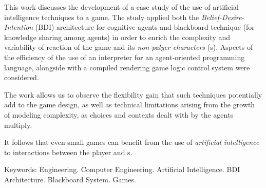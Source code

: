 This work discusses the development of a case study of the use of artificial intelligence techniques to a game. The study applied both the \emph{Belief-Desire-Intention} (BDI) architecture for cognitive agents and blackboard technique (for knowledge sharing among agents) in order to enrich the complexity and variability of reaction of the game and its \emph{non-palyer characters} (\npc{}s). Aspects of the efficiency of the use of an interpreter for an agent-oriented programming language, alongside with a compiled rendering game logic control system were considered.

The work allows us to observe the flexibility gain that such techniques potentially add to the game design, as well as technical limitations arising from the growth of modeling complexity, as choices and contexts dealt with by the agents multiply.

It follows that even small games can benefit from the use of \emph{artificial intelligence} to interactions between the player and \npc{}s.

Keywords: Engineering. Computer Engineering. Artificial
Intelligence. BDI Architecture. Blackboard System. Games.
